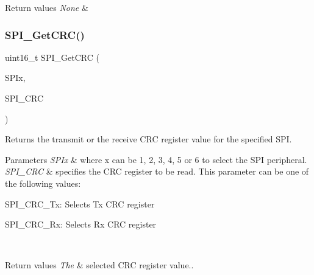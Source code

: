\begin{DoxyRetVals}{Return values}
{\em None} & \\
\hline
\end{DoxyRetVals}
\mbox{\label{group___s_p_i_ga4c81c193516e82cf0a2fdc149ef20cc6}} 
\subsubsection{\texorpdfstring{S\+P\+I\+\_\+\+Get\+C\+R\+C()}{SPI\_GetCRC()}}
{\footnotesize\ttfamily uint16\+\_\+t S\+P\+I\+\_\+\+Get\+C\+RC (\begin{DoxyParamCaption}\item[{S\+P\+I\+\_\+\+Type\+Def $\ast$}]{S\+P\+Ix,  }\item[{uint8\+\_\+t}]{S\+P\+I\+\_\+\+C\+RC }\end{DoxyParamCaption})}



Returns the transmit or the receive C\+RC register value for the specified S\+PI. 


\begin{DoxyParams}{Parameters}
{\em S\+P\+Ix} & where x can be 1, 2, 3, 4, 5 or 6 to select the S\+PI peripheral. \\
\hline
{\em S\+P\+I\+\_\+\+C\+RC} & specifies the C\+RC register to be read. This parameter can be one of the following values\+: \begin{DoxyItemize}
\item S\+P\+I\+\_\+\+C\+R\+C\+\_\+\+Tx\+: Selects Tx C\+RC register \item S\+P\+I\+\_\+\+C\+R\+C\+\_\+\+Rx\+: Selects Rx C\+RC register \end{DoxyItemize}
\\
\hline
\end{DoxyParams}

\begin{DoxyRetVals}{Return values}
{\em The} & selected C\+RC register value.. \\
\hline
\end{DoxyRetVals}
\mbox{\label{group___s_p_i_ga80fb9374cfce670f29128bb78568353f}} 

